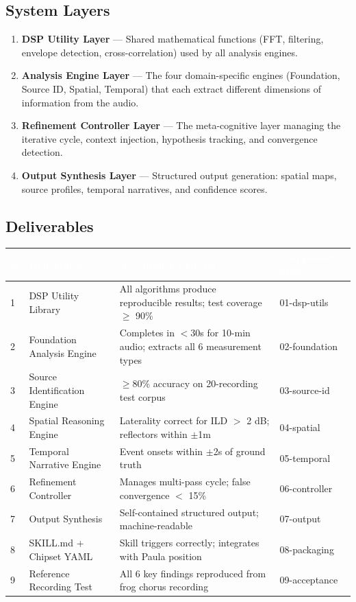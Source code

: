 \documentclass[11pt,letterpaper]{article}
\newcommand{\tableheader}[1]{\textbf{\sffamily\textcolor{white}{#1}}}
\begin{document}
\subsection{System Layers}

\begin{enumerate}[leftmargin=2em]
\item \textbf{DSP Utility Layer} --- Shared mathematical functions (FFT, filtering, envelope detection, cross-correlation) used by all analysis engines.
\item \textbf{Analysis Engine Layer} --- The four domain-specific engines (Foundation, Source ID, Spatial, Temporal) that each extract different dimensions of information from the audio.
\item \textbf{Refinement Controller Layer} --- The meta-cognitive layer managing the iterative cycle, context injection, hypothesis tracking, and convergence detection.
\item \textbf{Output Synthesis Layer} --- Structured output generation: spatial maps, source profiles, temporal narratives, and confidence scores.
\end{enumerate}

\subsection{Deliverables}

\begin{center}
\begin{tabularx}{\textwidth}{C{0.5cm}L{3.5cm}X L{3cm}}
\toprule
{}
\tableheader{\#} & \tableheader{Deliverable} & \tableheader{Acceptance Criteria} & \tableheader{Component Spec} \\
 & DSP Utility Library & All algorithms produce reproducible results; test coverage $\geq$ 90\% & 01-dsp-utils \\
2 & Foundation Analysis Engine & Completes in $<$30s for 10-min audio; extracts all 6 measurement types & 02-foundation \\
3 & Source Identification Engine & $\geq$80\% accuracy on 20-recording test corpus & 03-source-id \\
4 & Spatial Reasoning Engine & Laterality correct for ILD $>$ 2 dB; reflectors within $\pm$1m & 04-spatial \\
5 & Temporal Narrative Engine & Event onsets within $\pm$2s of ground truth & 05-temporal \\
6 & Refinement Controller & Manages multi-pass cycle; false convergence $<$ 15\% & 06-controller \\
7 & Output Synthesis & Self-contained structured output; machine-readable & 07-output \\
8 & SKILL.md + Chipset YAML & Skill triggers correctly; integrates with Paula position & 08-packaging \\
9 & Reference Recording Test & All 6 key findings reproduced from frog chorus recording & 09-acceptance \\
\bottomrule
\end{tabularx}
\end{center}
\end{document}
